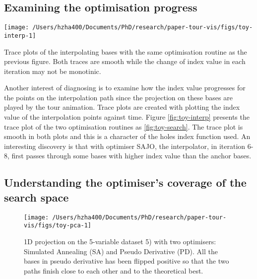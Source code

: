 \hypertarget{toy-interp}{%
\subsection{Examining the optimisation progress}\label{toy-interp}}

\begin{Schunk}
\begin{widefigure}

{\centering \texttt{[image: /Users/hzha400/Documents/PhD/research/paper-tour-vis/figs/toy-interp-1]} 

}

\caption[Trace plots of the interpolating bases with the same optimisation routine as the previous figure]{Trace plots of the interpolating bases with the same optimisation routine as the previous figure. Both traces are smooth while the change of index value in each iteration may not be monotinic.}\label{fig:toy-interp}
\end{widefigure}
\end{Schunk}

Another interest of diagnosing is to examine how the index value
progresses for the points on the interpolation path since the projection
on these bases are played by the tour animation. Trace plots are created
with plotting the index value of the interpolation points against time.
Figure \ref{fig:toy-interp} presents the trace plot of the two
optimisation routines as \ref{fig:toy-search}. The trace plot is smooth
in both plots and this is a character of the holes index function used.
An interesting discovery is that with optimiser SAJO, the interpolator,
in iteration 6-8, first passes through some bases with higher index
value than the anchor bases.

\hypertarget{understanding-the-optimisers-coverage-of-the-search-space}{%
\subsection{Understanding the optimiser's coverage of the search
space}\label{understanding-the-optimisers-coverage-of-the-search-space}}

\begin{Schunk}
\begin{figure}

{\centering \texttt{[image: /Users/hzha400/Documents/PhD/research/paper-tour-vis/figs/toy-pca-1]} 

}

\caption[1D projection on the 5-variable dataset 5) with two optimisers]{1D projection on the 5-variable dataset 5) with two optimisers: Simulated Annealing (SA) and Pseudo Derivative (PD). All the bases in pseudo derivative has been flipped positive so that the two paths finish close to each other and to the theoretical best.}\label{fig:toy-pca}
\end{figure}
\end{Schunk}

